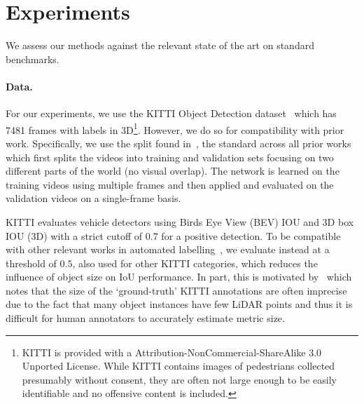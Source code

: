 \section{Experiments}\label{s:experiments}

We assess our methods against the relevant state of the art on standard benchmarks.

\paragraph{Data.}\label{s:expsetup}

For our experiments, we use the KITTI Object Detection dataset~\cite{geiger12are-we-ready} which has 7481 frames with labels in 3D\footnote{KITTI is provided with a Attribution-NonCommercial-ShareAlike 3.0 Unported License.
While KITTI contains images of pedestrians collected presumably without consent, they are often not large enough to be easily identifiable and no offensive content is included.}.
However, we do so for compatibility with prior work.
Specifically, we use the split found in~\cite{chen2017multiview}, the standard across all prior works which  first splits the videos into training and validation sets focusing on two different parts of the world (no visual overlap).
The network is learned on the training videos using multiple frames and then applied and evaluated on the validation videos on a single-frame basis.

KITTI evaluates vehicle detectors using Birds Eye View (BEV) IOU and 3D box IOU (3D) with a strict cutoff of $0.7$ for a positive detection.
To be compatible with other relevant works in automated labelling~\cite{sdflabel, qin20weakly}, we evaluate instead at a threshold of $0.5$, also used for other KITTI categories, which reduces the influence of object size on IoU performance.
In part, this is motivated by~\cite{feng2020labels} which notes that the size of the `ground-truth' KITTI annotations are often imprecise due to the fact that many object instances have few LiDAR points and thus it is difficult for human annotators to accurately estimate metric size.

